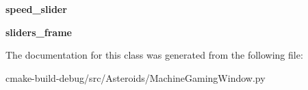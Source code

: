 \begin{DoxyCompactItemize}
\item 
{\bfseries speed\+\_\+slider}\hypertarget{classMachineGamingWindow_1_1MachineGaming_af7c7c359266bfb1d16fc8fb45259eef6}{}\label{classMachineGamingWindow_1_1MachineGaming_af7c7c359266bfb1d16fc8fb45259eef6}

\item 
{\bfseries sliders\+\_\+frame}\hypertarget{classMachineGamingWindow_1_1MachineGaming_a80b48006f970e43673c576d5c688ff8a}{}\label{classMachineGamingWindow_1_1MachineGaming_a80b48006f970e43673c576d5c688ff8a}

\end{DoxyCompactItemize}


The documentation for this class was generated from the following file\+:\begin{DoxyCompactItemize}
\item 
cmake-\/build-\/debug/src/\+Asteroids/Machine\+Gaming\+Window.\+py\end{DoxyCompactItemize}

